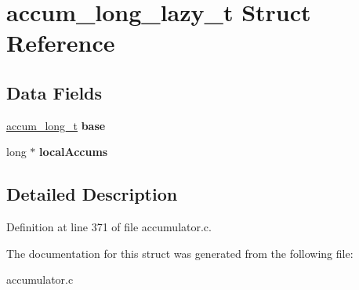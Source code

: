 \hypertarget{structaccum__long__lazy__t}{\section{accum\-\_\-long\-\_\-lazy\-\_\-t Struct Reference}
\label{structaccum__long__lazy__t}
}
\subsection*{Data Fields}
\begin{DoxyCompactItemize}
\item 
\hypertarget{structaccum__long__lazy__t_a2beb9370f5146fad4b67546e3c5b381d}{\hyperlink{structaccum__long__t}{accum\-\_\-long\-\_\-t} {\bfseries base}}\label{structaccum__long__lazy__t_a2beb9370f5146fad4b67546e3c5b381d}

\item 
\hypertarget{structaccum__long__lazy__t_a5a8adbcc6b159099c5077f9b6b06f44c}{long $\ast$ {\bfseries local\-Accums}}\label{structaccum__long__lazy__t_a5a8adbcc6b159099c5077f9b6b06f44c}

\end{DoxyCompactItemize}


\subsection{Detailed Description}


Definition at line 371 of file accumulator.\-c.



The documentation for this struct was generated from the following file\-:\begin{DoxyCompactItemize}
\item 
accumulator.\-c\end{DoxyCompactItemize}
